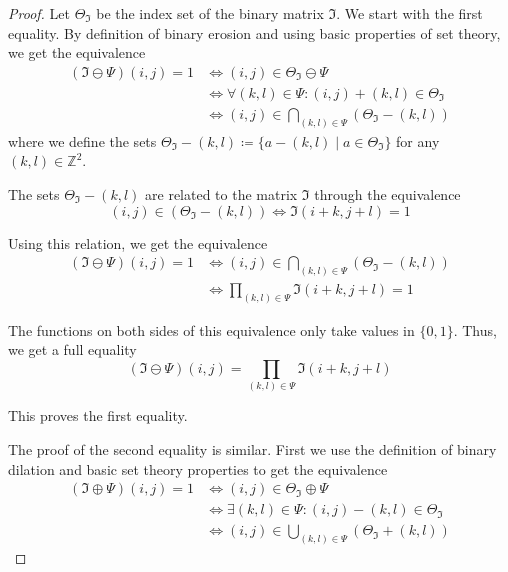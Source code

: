 \documentclass[a4paper,12pt]{article}
\theoremstyle{plain}
\theoremstyle{definition}
\begin{document}
\begin{proof}
	Let $\Theta_\mathfrak{I}$ be the index set of the binary matrix $\mathfrak{I}$. We start with the first equality. By definition of binary erosion and using basic properties of set theory, we get the equivalence
	\begin{align*}
		(\mathfrak{I} \ominus \Psi)(i, j) = 1 &\Leftrightarrow (i, j) \in \Theta_\mathfrak{I} \ominus \Psi \\
		&\Leftrightarrow \forall (k, l) \in \Psi: (i, j) + (k, l) \in \Theta_\mathfrak{I} \\
		&\Leftrightarrow (i, j) \in \bigcap_{(k, l) \in \Psi} ( \Theta_\mathfrak{I} - (k, l) )
	\end{align*}
	where we define the sets $\Theta_\mathfrak{I} - (k, l) \coloneqq \{ a - (k, l) \mid a \in \Theta_\mathfrak{I} \}$ for any $(k, l) \in \mathbb{Z}^2$.
	
	The sets $\Theta_\mathfrak{I} - (k, l)$ are related to the matrix $\mathfrak{I}$ through the equivalence
	\begin{equation*}
		(i, j) \in ( \Theta_\mathfrak{I} - (k, l) ) \Leftrightarrow \mathfrak{I}(i + k, j + l) = 1
	\end{equation*}
	
	Using this relation, we get the equivalence
	\begin{align*}
		(\mathfrak{I} \ominus \Psi)(i, j) = 1 &\Leftrightarrow (i, j) \in \bigcap_{(k, l) \in \Psi} ( \Theta_\mathfrak{I} - (k, l) ) \\
		&\Leftrightarrow \prod_{(k, l) \in \Psi} \mathfrak{I}(i + k, j + l) = 1
	\end{align*}
	
	The functions on both sides of this equivalence only take values in $\{ 0, 1 \}$. Thus, we get a full equality
	\begin{equation*}
		(\mathfrak{I} \ominus \Psi)(i, j) = \prod_{(k, l) \in \Psi} \mathfrak{I}(i + k, j + l)
	\end{equation*}
	
	This proves the first equality.
	
	The proof of the second equality is similar. First we use the definition of binary dilation and basic set theory properties to get the equivalence
	\begin{align*}
		(\mathfrak{I} \oplus \Psi)(i, j) = 1 &\Leftrightarrow (i, j) \in \Theta_\mathfrak{I} \oplus \Psi \\
		&\Leftrightarrow \exists (k, l) \in \Psi: (i, j) - (k, l) \in \Theta_\mathfrak{I} \\
		&\Leftrightarrow (i, j) \in \bigcup_{(k, l) \in \Psi} ( \Theta_\mathfrak{I} + (k, l) )
	\end{align*}
	

\end{proof}
\end{document}
